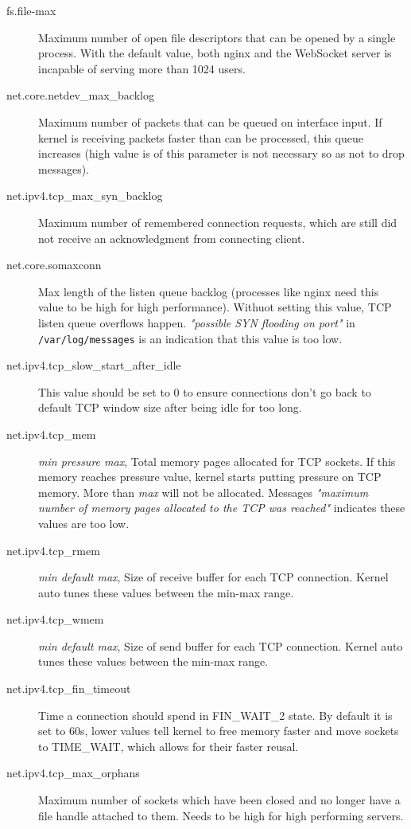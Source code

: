 \documentclass{uvamscse}
\begin{document}
\begin{description}
  \item[fs.file-max] Maximum number of open file descriptors that can be opened by a single process. With the default value, both nginx and the WebSocket server is incapable of serving more than 1024 users.
  \item[net.core.netdev\_max\_backlog] Maximum number of packets that can be queued on interface input. If kernel is receiving packets faster than can be processed, this queue increases (high value is of this parameter is not necessary so as not to drop messages).
  \item[net.ipv4.tcp\_max\_syn\_backlog] Maximum number of remembered connection requests, which are still did not receive an acknowledgment from connecting client.
  \item[net.core.somaxconn] Max length of the listen queue backlog (processes like nginx need this value to be high for high performance). Withuot setting this value, TCP listen queue overflows happen. \textit{"possible SYN flooding on port"} in \texttt{/var/log/messages} is an indication that this value is too low.
  \item[net.ipv4.tcp\_slow\_start\_after\_idle] This value should be set to 0 to ensure connections don't go back to default TCP window size after being idle for too long.
  \item[net.ipv4.tcp\_mem] \textit{min pressure max}, Total memory pages allocated for TCP sockets. If this memory reaches pressure value, kernel starts putting pressure on TCP memory. More than \textit{max} will not be allocated. Messages \textit{"maximum number of memory pages allocated to the TCP was reached"} indicates these values are too low.
  \item[net.ipv4.tcp\_rmem] \textit{min default max}, Size of receive buffer for each TCP connection. Kernel auto tunes these values between the min-max range.
  \item[net.ipv4.tcp\_wmem] \textit{min default max}, Size of send buffer for each TCP connection. Kernel auto tunes these values between the min-max range.
  \item[net.ipv4.tcp\_fin\_timeout] Time a connection should spend in FIN\_WAIT\_2 state. By default it is set to 60s, lower values tell kernel to free memory faster and move sockets to TIME\_WAIT, which allows for their faster reusal.
  \item[net.ipv4.tcp\_max\_orphans] Maximum number of sockets which have been closed and no longer have a file handle attached to them. Needs to be high for high performing servers.

\end{description}
\end{document}
